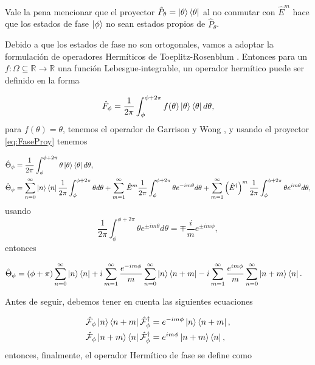         Vale la pena mencionar que el proyector $\hat{P}_\theta = \ket{\theta}\bra{\theta}$ al no conmutar con $\hat{E}^m$ hace que los estados de fase $\ket{\phi}$ no sean estados propios de $\hat{P}_\theta$.

        Debido a que los estados de fase no son ortogonales, vamos a adoptar la formulación de operadores Hermíticos de Toeplitz-Rosenblum \cite{rosenblum1962self}. Entonces para un $f: \Omega \subseteq \mathbb{R} \to \mathbb{R}$ una función Lebesgue-integrable, un operador hermítico puede ser definido en la forma

        \begin{equation}
            \hat{F}_\phi = \frac{1}{2\pi}\int_\phi ^{\phi + 2\pi} f(\theta) \ket{\theta}\bra{\theta}d\theta,
        \end{equation}
        para $f(\theta) = \theta$, tenemos el operador de Garrison y Wong \cite{garrison1970canonically}, y usando el proyector \ref{eq:FaseProy} tenemos

        \begin{align}
            & \hat{\Theta}_\phi = \frac{1}{2\pi}\int_\phi^{\phi+2\pi}\theta\ket{\theta}\bra{\theta}d\theta,\\
            & \hat{\Theta}_\phi = \sum_{n=0}^\infty \ket{n}\bra{n}\frac{1}{2\pi}\int_\phi^{\phi+2\pi} \theta d\theta + \sum_{m=1}^\infty \hat{E}^m\frac{1}{2\pi}\int_{\phi}^{\phi+2\pi}\theta e^{-im\theta}d\theta + \sum_{m=1}^\infty \left( \hat{E}^\dagger \right)^m \frac{1}{2\pi}\int_\phi^{\phi+2\pi}\theta e^{im\theta}d\theta,
        \end{align}
        usando
        \begin{equation}
            \frac{1}{2\pi}\int_{\phi}^{\phi+2\pi} \theta e^{\pm im\theta}d\theta = \mp \frac{i}{m}e^{\pm im\phi},
        \end{equation}
        entonces

        \begin{align}
            & \hat{\Theta}_\phi = (\phi+\pi) \sum_{n=0}^\infty \ket{n}\bra{n} + i \sum_{m=1}^\infty \frac{e^{-im\phi}}{m}\sum_{n=0}^\infty \ket{n}\bra{n+m} - i \sum_{m=1}^\infty \frac{e^{im\phi}}{m}\sum_{n=0}^\infty \ket{n+m}\bra{n}.
        \end{align}

        Antes de seguir, debemos tener en cuenta las siguientes ecuaciones

        \begin{align}
            & \hat{\mathcal{F}}_\phi \ket{n}\bra{n+m}\hat{\mathcal{F}}_\phi^\dagger = e^{-im\phi}\ket{n}\bra{n+m},\\
            & \hat{\mathcal{F}}_\phi \ket{n+m}\bra{n}\hat{\mathcal{F}}_\phi^\dagger = e^{im\phi}\ket{n+m}\bra{n},
        \end{align}
        entonces, finalmente, el operador Hermítico de fase se define como

